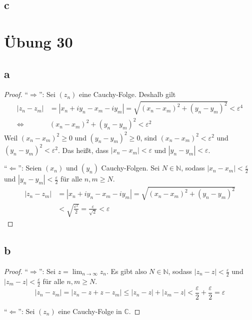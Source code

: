 \documentclass[a4paper,10pt]{article}
\begin{document}
\subsection*{c}

\section*{Übung 30}

\subsection*{a}

\begin{proof}
 ``$\Rightarrow$'': Sei $(z_n)$ eine Cauchy-Folge.
 Deshalb gilt
 \begin{align*}
  |z_n - z_m| & = |x_n + iy_n - x_m - iy_m| = \sqrt{(x_n - x_m)^2 + (y_n - y_m)^2} < \varepsilon^4\\
  \Leftrightarrow & (x_n - x_m)^2 + (y_n - y_m)^2 < \varepsilon^2
 \end{align*}
 Weil $(x_n - x_m)^2 \ge 0$ und $(y_n - y_m)^2 \ge 0$, sind $(x_n - x_m)^2 < \varepsilon^2$ und $(y_n - y_m)^2 < \varepsilon^2$.
 Das heißt, dass $|x_n - x_m| < \varepsilon$ und $|y_n - y_m| < \varepsilon$.
 
 ``$\Leftarrow$'': Seien $(x_n)$ und $(y_n)$ Cauchy-Folgen.
 Sei $N \in \mathbb{N}$, sodass $|x_n - x_m| < \frac{\varepsilon}{2}$ und $|y_n - y_m| < \frac{\varepsilon}{2}$ für alle $n, m \ge N$.
 \begin{align*}
  |z_n - z_m| & = |x_n + iy_n - x_m - iy_m| = \sqrt{(x_n - x_m)^2 + (y_n - y_m)^2}\\
  & < \sqrt{\frac{\varepsilon^2}{2}} = \frac{\varepsilon}{\sqrt{2}} < \varepsilon
 \end{align*}
\end{proof}

\subsection*{b}

\begin{proof}
 ``$\Rightarrow$'': Sei $z = \lim_{n \rightarrow \infty} z_n$.
 Es gibt also $N \in \mathbb{N}$, sodass $|z_n - z| < \frac{\varepsilon}{2}$ und $|z_m - z| < \frac{\varepsilon}{2}$ für alle $n, m \ge N$.
 \begin{equation}
  |z_n - z_m| = |z_n - z + z - z_m| \le |z_n - z| + |z_m - z| < \frac{\varepsilon}{2} + \frac{\varepsilon}{2} = \varepsilon
 \end{equation}
 
 ``$\Leftarrow$'': Sei $(z_n)$ eine Cauchy-Folge in $\mathbb{C}$.
 
\end{proof}
\end{document}
